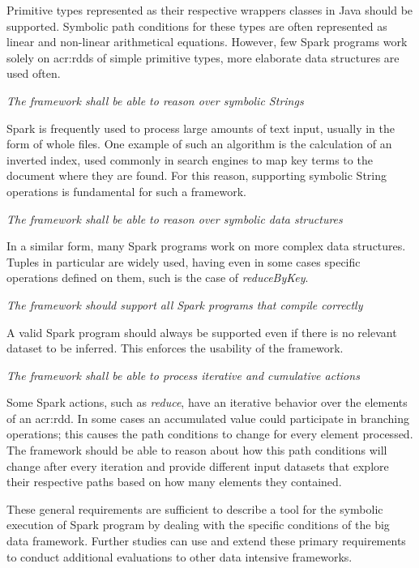\begin{itemize}
Primitive types represented as their respective wrappers classes in Java should be supported. Symbolic path conditions for these types are often represented as linear and non-linear arithmetical equations. However, few Spark programs work solely on \acrshort{acr:rdd}s of simple primitive types, more elaborate data structures are used often.
	
 \textit{The framework shall be able to reason over symbolic Strings}

Spark is frequently used to process large amounts of text input, usually in the form of whole files. One example of such an algorithm is the calculation of an inverted index, used commonly in search engines to map key terms to the document where they are found. For this reason, supporting symbolic String operations is fundamental for such a framework.
	
 \textit{The framework shall be able to reason over symbolic data structures}

In a similar form, many Spark programs work on more complex data structures. Tuples in particular are widely used, having even in some cases specific operations defined on them, such is the case of \textit{reduceByKey}.
	
 \textit{The framework should support all Spark programs that compile correctly}

A valid Spark program should always be supported even if there is no relevant dataset to be inferred. This enforces the usability of the framework.
	
 \textit{The framework shall be able to process iterative and cumulative actions}

Some Spark actions, such as \textit{reduce}, have an iterative behavior over the elements of an \acrshort{acr:rdd}. In some cases an accumulated value could participate in branching operations; this causes the path conditions to change for every element processed. The framework should be able to reason about how this path conditions will change after every iteration and provide different input datasets that explore their respective paths based on how many elements they contained.

\end{itemize}

These general requirements are sufficient to describe a tool for the symbolic execution of Spark program by dealing with the specific conditions of the big data framework. Further studies can use and extend these primary requirements to conduct additional evaluations to other data intensive frameworks. 

